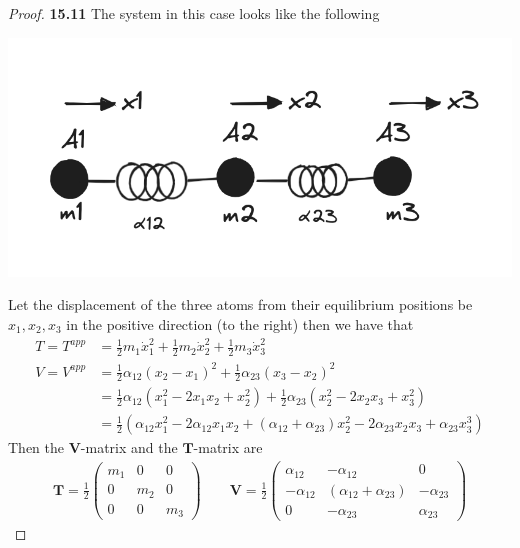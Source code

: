 \documentclass[11pt]{article}
\theoremstyle{definition}
\begin{document}
\begin{proof}{\textbf{15.11}}
    The system in this case looks like the following 
    \begin{center}
        \includegraphics[scale=0.45]{ch15-11.png}
    \end{center}
    Let the displacement of the three atoms from their equilibrium positions
    be $x_1, x_2, x_3$ in the positive direction (to the right)
    then we have that
    \begin{align*}
        T = T^{app} &= \frac{1}{2}m_1\dot{x}_1^2 + \frac{1}{2}m_2\dot{x}_2^2 +
        \frac{1}{2}m_3\dot{x}_3^2\\
        V = V^{app} &=
        \frac{1}{2}\alpha_{12}(x_2 - x_1)^2 + \frac{1}{2}\alpha_{23}(x_3 - x_2)^2\\
        &= \frac{1}{2}\alpha_{12}(x_1^2 - 2x_1x_2 + x_2^2) + 
        \frac{1}{2}\alpha_{23}(x_2^2 - 2x_2x_3 + x_3^2)\\
        &= \frac{1}{2}(\alpha_{12}x_1^2 - 2\alpha_{12}x_1x_2 + 
        (\alpha_{12} + \alpha_{23})x_2^2 - 2\alpha_{23}x_2x_3 + \alpha_{23}x_3^3)
    \end{align*}
    Then the $\bm{V}$-matrix and the $\bm{T}$-matrix are 
    \begin{align*}
        \bm{T} = \frac{1}{2}\begin{pmatrix}
            m_1 & 0 & 0 \\
            0 & m_2 & 0 \\
            0 & 0 & m_3
        \end{pmatrix}
        \quad\quad
        \bm{V} = \frac{1}{2}\begin{pmatrix}
            \alpha_{12} & -\alpha_{12} & 0\\
            -\alpha_{12} & (\alpha_{12} + \alpha_{23}) & -\alpha_{23}\\
            0 & -\alpha_{23} & \alpha_{23}
        \end{pmatrix}

\end{align*}
\end{proof}
\end{document}
